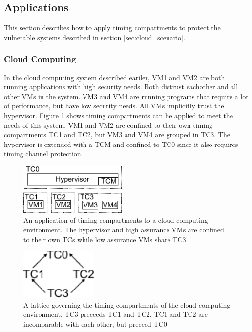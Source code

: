     \subsection{Applications}
    This section describes how to apply timing compartments to protect the 
    vulnerable systems described in section \ref{sec:cloud_scenario}.
    \subsubsection{Cloud Computing}
    In the cloud computing system described eariler, VM1 and VM2 are both 
    running applications with high security needs. Both distrust eachother and 
    all other VMs in the system. VM3 and VM4 are running programs that require 
    a lot of performance, but have low security needs. All VMs implicitly trust 
    the hypervisor. Figure \ref{fig:cloud_tcs} shows timing compartments can be 
    applied to meet the needs of this system. VM1 and VM2 are confined to their 
    own timing compartments TC1 and TC2, but VM3 and VM4 are grouped in TC3.  
    The hypervisor is extended with a TCM and confined to TC0 since it also 
    requires timing channel protection. 
    
    \begin{figure}
        \begin{center}
            \includegraphics[width=2.1in]{figs/cloud_tcs.pdf}
            \caption{ An application of timing compartments to a cloud 
                computing environment. The hypervisor and high assurance VMs 
                are confined to their own TCs while low assurance VMs share TC3
            }
            \label{fig:cloud_tcs}
        \end{center}
    \end{figure}

    \begin{figure}
        \begin{center}
            \includegraphics[width=1.5in]{figs/cloud_lattice.pdf}
            \caption{ A lattice governing the timing compartments of the cloud 
                computing environment. TC3 preceeds TC1 and TC2. TC1 and TC2 
                are incomparable with each other, but preceed TC0
            }
            \label{fig:cloud_lattice}
        \end{center}
    \end{figure}

